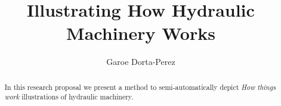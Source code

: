\documentclass[11pt]{report}
\title{ Illustrating How Hydraulic Machinery Works } \author{Garoe Dorta-Perez}
\begin{document}
\maketitle
\begin{abstract}
In this research proposal we present a method to semi-automatically depict \textit{How things work} illustrations of hydraulic machinery. \end{abstract}











\end{document}
